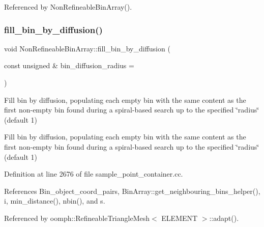 Referenced by Non\+Refineable\+Bin\+Array().

\mbox{\label{classNonRefineableBinArray_a78f35a6feaf2c540998ec059639a8bf4}} 
\subsubsection{\texorpdfstring{fill\+\_\+bin\+\_\+by\+\_\+diffusion()}{fill\_bin\_by\_diffusion()}}
{\footnotesize\ttfamily void Non\+Refineable\+Bin\+Array\+::fill\+\_\+bin\+\_\+by\+\_\+diffusion (\begin{DoxyParamCaption}\item[{const unsigned \&}]{bin\+\_\+diffusion\+\_\+radius = {} }\end{DoxyParamCaption})}



Fill bin by diffusion, populating each empty bin with the same content as the first non-\/empty bin found during a spiral-\/based search up to the specified \char`\"{}radius\char`\"{} (default 1) 

Fill bin by diffusion, populating each empty bin with the same content as the first non-\/empty bin found during a spiral-\/based search up to the specified \char`\"{}radius\char`\"{} (default 1) 

Definition at line 2676 of file sample\+\_\+point\+\_\+container.\+cc.



References Bin\+\_\+object\+\_\+coord\+\_\+pairs, Bin\+Array\+::get\+\_\+neighbouring\+\_\+bins\+\_\+helper(), i, min\+\_\+distance(), nbin(), and s.



Referenced by oomph\+::\+Refineable\+Triangle\+Mesh$<$ E\+L\+E\+M\+E\+N\+T $>$\+::adapt().

\mbox{\label{classNonRefineableBinArray_acf0ff698280d40cf44a637d7df31cf90}} 
